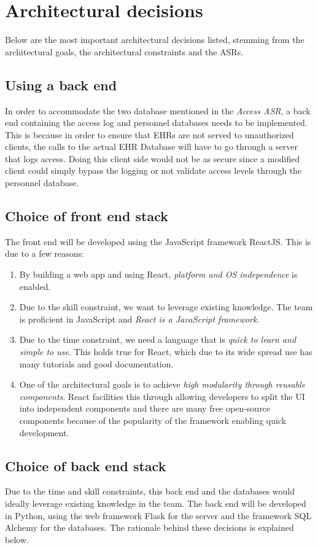\documentclass{article}
\begin{document}
\section{Architectural decisions}
Below are the most important architectural decisions listed, stemming from the architectural goals, the architectural constraints and the ASRs.

\subsection{Using a back end}
In order to accommodate the two database mentioned in the \emph{Access ASR}, a back end containing the access log and personnel databases needs to be implemented. This is because in order to ensure that EHRs are not served to unauthorized clients, the calls to the actual EHR Database will have to go through a server that logs access. Doing this client side would not be as secure since a modified client could simply bypass the logging or not validate access levels through the personnel database.

\subsection{Choice of front end stack}
The front end will be developed using the JavaScript framework ReactJS. This is due to a few reasons:

\begin{enumerate}[label=(\roman*)]
\item By building a web app and using React, \emph{platform and OS independence} is enabled.
\item Due to the skill constraint, we want to leverage existing knowledge. The team is proficient in JavaScript and \emph{React is a JavaScript framework}.
\item Due to the time constraint, we need a language that is \emph{quick to learn and simple to use}. This holds true for React, which due to its wide spread use has many tutorials and good documentation.
\item One of the architectural goals is to achieve \emph{high modularity through reusable components}. React facilities this through allowing developers to split the UI into independent components and there are many free open-source components because of the popularity of the framework enabling quick development.
\end{enumerate}

\subsection{Choice of back end stack}
Due to the time and skill constraints, this back end and the databases would ideally leverage existing knowledge in the team. The back end will be developed in Python, using the web framework Flask for the server and the framework SQL Alchemy for the databases. The rationale behind these decisions is explained below.
\end{document}
